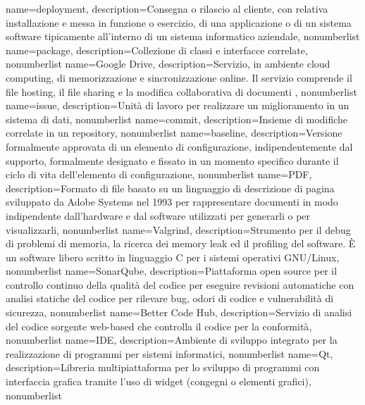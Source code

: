 {
	name={deployment},
	description={Consegna o rilascio al cliente, con relativa installazione e messa in funzione o esercizio, di una applicazione o di un sistema software tipicamente all'interno di un sistema informatico aziendale},
	nonumberlist
}
{
	name={package},
	description={Collezione di classi e interfacce correlate},
	nonumberlist
}
{
	name={Google Drive},
	description={Servizio, in ambiente cloud computing, di memorizzazione e sincronizzazione online. Il servizio comprende il file hosting, il file sharing e la modifica collaborativa di documenti },
	nonumberlist
}
{
	name={issue},
	description={Unità di lavoro per realizzare un miglioramento in un sistema di dati},
	nonumberlist
}
{
	name={commit},
	description={Insieme di modifiche correlate in un repository},
	nonumberlist
}
{
	name={baseline},
	description={Versione formalmente approvata di un elemento di configurazione, indipendentemente dal supporto, formalmente designato e fissato in un momento specifico durante il ciclo di vita dell'elemento di configurazione},
	nonumberlist
}
{
	name={PDF},
	description={Formato di file basato su un linguaggio di descrizione di pagina sviluppato da Adobe Systems nel 1993 per rappresentare documenti in modo indipendente dall'hardware e dal software utilizzati per generarli o per visualizzarli},
	nonumberlist
}
{
	name={Valgrind},
	description={Strumento per il debug di problemi di memoria, la ricerca dei memory leak ed il profiling del software. È un software libero scritto in linguaggio C per i sistemi operativi GNU/Linux},
	nonumberlist
}
{
	name={SonarQube},
	description={Piattaforma open source per il controllo continuo della qualità del codice per eseguire revisioni automatiche con analisi statiche del codice per rilevare bug, odori di codice e vulnerabilità di sicurezza},
	nonumberlist
}
{
	name={Better Code Hub},
	description={Servizio di analisi del codice sorgente web-based che controlla il codice per la conformità},
	nonumberlist
}
{
	name={IDE},
	description={Ambiente di sviluppo integrato per la realizzazione di programmi per sistemi informatici},
	nonumberlist
}
{
	name={Qt},
	description={Libreria multipiattaforma per lo sviluppo di programmi con interfaccia grafica tramite l'uso di widget (congegni o elementi grafici)},
	nonumberlist
}
